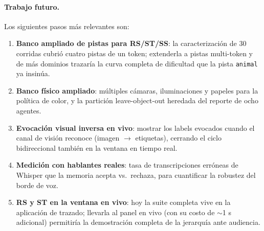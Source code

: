 \paragraph{Trabajo futuro.}
Los siguientes pasos más relevantes son:
\begin{enumerate}
    \item \textbf{Banco ampliado de pistas para RS/ST/SS}: la caracterización de 30
    corridas cubrió cuatro pistas de un token; extenderla a pistas multi-token y de
    más dominios trazaría la curva completa de dificultad que la pista
    \texttt{animal} ya insinúa.
    \item \textbf{Banco físico ampliado}: múltiples cámaras, iluminaciones y papeles
    para la política de color, y la partición leave-object-out heredada del reporte de
    ocho agentes.
    \item \textbf{Evocación visual inversa en vivo}: mostrar los labels evocados
    cuando el canal de visión reconoce (imagen $\to$ etiquetas), cerrando el ciclo
    bidireccional también en la ventana en tiempo real.
    \item \textbf{Medición con hablantes reales}: tasa de transcripciones erróneas de
    Whisper que la memoria acepta vs.\ rechaza, para cuantificar la robustez del
    borde de voz.
    \item \textbf{RS y ST en la ventana en vivo}: hoy la suite completa vive en la
    aplicación de trazado; llevarla al panel en vivo (con su costo de $\sim$1 s
    adicional) permitiría la demostración completa de la jerarquía ante audiencia.
\end{enumerate}
